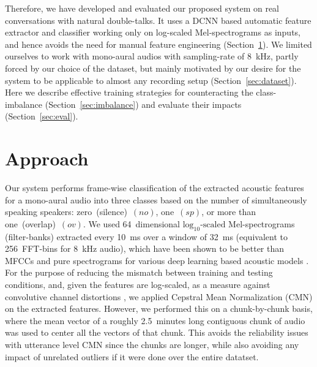 \documentclass[a4paper]{article}
\begin{document}
Therefore, we have developed and evaluated our proposed system on real conversations with natural double-talks.
It uses a DCNN based automatic feature extractor and classifier working only on
log-scaled Mel-spectrograms as inputs,
and hence avoids the need for manual feature engineering
(Section~\ref{sec:approach}).
We limited ourselves to work with mono-aural audios with sampling-rate of 8~kHz,
partly forced by our choice of the dataset,
but mainly motivated by our desire for the system to be applicable to almost any recording setup
(Section~\ref{sec:dataset}).
Here we describe effective training strategies for counteracting the class-imbalance
(Section~\ref{sec:imbalance}) and evaluate their impacts (Section~\ref{sec:eval}).

\section{Approach} \label{sec:approach}
Our system performs frame-wise classification of the extracted acoustic features for a mono-aural audio into three classes based on the number of simultaneously speaking speakers:
zero~(silence)~$(no)$, one~$(sp)$, or more than one~(overlap)~$(ov)$.
We used 64~dimensional $\text{log}_{10} \text{-scaled}$ Mel-spectrograms (filter-banks)
extracted every 10~ms over a window of 32~ms (equivalent to 256~FFT-bins for 8~kHz audio),
which have been shown to be better than MFCCs and pure spectrograms
for various deep learning based acoustic models \cite{deng_recent_2013}.
For the purpose of reducing the mismatch between training and testing conditions,
and, given the features are log-scaled, as a measure against convolutive channel distortions \cite{li_overview_2014},
we applied Cepstral Mean Normalization (CMN) on the extracted features.
However, we performed this on a chunk-by-chunk basis,
where the mean vector of a roughly 2.5~minutes long contiguous chunk of audio was used to center all the vectors of that chunk.
This avoids the reliability issues with utterance level CMN \cite{prasad_improved_2013}
since the chunks are longer,
while also avoiding any impact of unrelated outliers if it were done over the entire datatset.
\end{document}
